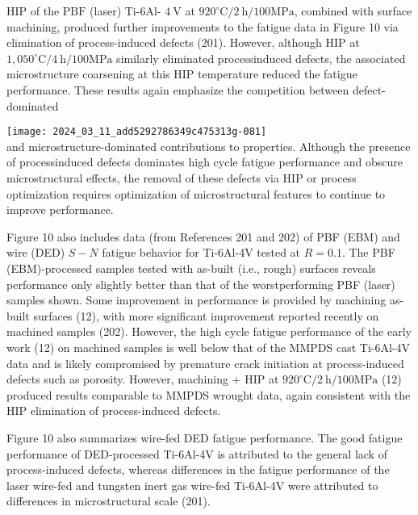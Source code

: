\documentclass[10pt]{article}
\begin{document}
HIP of the $\mathrm{PBF}$ (laser) Ti-6Al- $4 \mathrm{~V}$ at $920^{\circ} \mathrm{C} / 2 \mathrm{~h} / 100 \mathrm{MPa}$, combined with surface machining, produced further improvements to the fatigue data in Figure 10 via elimination of process-induced defects (201). However, although HIP at $1,050^{\circ} \mathrm{C} / 4 \mathrm{~h} / 100 \mathrm{MPa}$ similarly eliminated processinduced defects, the associated microstructure coarsening at this HIP temperature reduced the fatigue performance. These results again emphasize the competition between defect-dominated

\texttt{[image: 2024\_03\_11\_add5292786349c475313g-081]}\\
and microstructure-dominated contributions to properties. Although the presence of processinduced defects dominates high cycle fatigue performance and obscure microstructural effects, the removal of these defects via HIP or process optimization requires optimization of microstructural features to continue to improve performance.

Figure 10 also includes data (from References 201 and 202) of PBF (EBM) and wire (DED) $S-N$ fatigue behavior for Ti-6Al-4V tested at $R=0.1$. The PBF (EBM)-processed samples tested with as-built (i.e., rough) surfaces reveals performance only slightly better than that of the worstperforming PBF (laser) samples shown. Some improvement in performance is provided by machining as-built surfaces (12), with more significant improvement reported recently on machined samples (202). However, the high cycle fatigue performance of the early work (12) on machined samples is well below that of the MMPDS cast Ti-6Al-4V data and is likely compromised by premature crack initiation at process-induced defects such as porosity. However, machining + $\mathrm{HIP}$ at $920^{\circ} \mathrm{C} / 2 \mathrm{~h} / 100 \mathrm{MPa}$ (12) produced results comparable to MMPDS wrought data, again consistent with the HIP elimination of process-induced defects.

Figure 10 also summarizes wire-fed DED fatigue performance. The good fatigue performance of DED-processed Ti-6Al-4V is attributed to the general lack of process-induced defects, whereas differences in the fatigue performance of the laser wire-fed and tungsten inert gas wire-fed Ti-6Al-4V were attributed to differences in microstructural scale (201).
\end{document}
